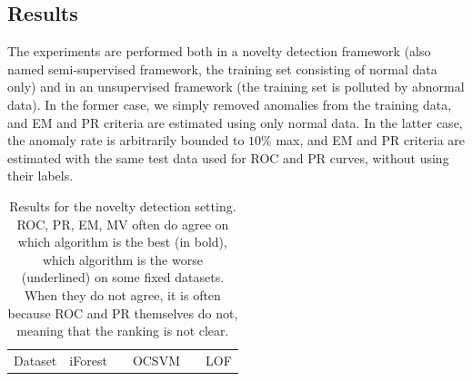 \subsection{Results}

The experiments are performed both in a novelty detection framework (also named semi-supervised framework, the training set consisting of normal data only) and in an unsupervised framework (the training set is polluted by abnormal data).
In the former case, we simply removed anomalies from the training data, and EM and PR criteria are estimated using only normal data.
In the latter case, the anomaly rate is arbitrarily bounded to $10\%$ max, and EM and PR criteria are estimated with the same test data used for ROC and PR curves, without using their labels.

\begin{table}[!ht]
\centering
\caption{Results for the novelty detection setting. ROC, PR, EM, MV often do agree on which algorithm is the best (in bold), which algorithm is the worse (underlined) on some fixed datasets. When they do not agree, it is often because ROC and PR themselves do not, meaning that the ranking is not clear.}
\label{evaluation:table:results-semisupervised}
\footnotesize
\tabcolsep=0.11cm
\resizebox{\linewidth}{!} {
\begin{tabular}{l cccc c cccc c cccc}
\toprule
Dataset      & \multicolumn{4}{c}{iForest}& & \multicolumn{4}{c}{OCSVM}&  & \multicolumn{4}{c}{LOF} \\ %
  \cmidrule{1-15}


\end{tabular}}
\end{table}
